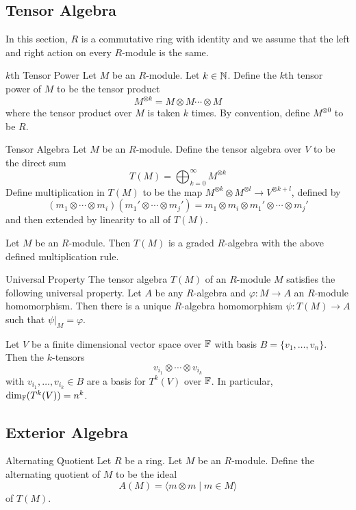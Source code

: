 \documentclass[a4paper]{article}
\begin{document}
\subsection{Tensor Algebra}
In this section, $R$ is a commutative ring with identity and we assume that the left and right action on every $R$-module is the same. 

\begin{defn}{$k$th Tensor Power}{} Let $M$ be an $R$-module. Let $k\in\mathbb{N}$. Define the $k$th tensor power of $M$ to be the tensor product $$M^{\otimes k}=M\otimes M\cdots\otimes M$$ where the tensor product over $M$ is taken $k$ times. By convention, define $M^{\otimes 0}$ to be $R$. 
\end{defn}

\begin{defn}{Tensor Algebra}{} Let $M$ be an $R$-module. Define the tensor algebra over $V$ to be the direct sum $$T(M)=\bigoplus_{k=0}^\infty M^{\otimes k}$$ Define multiplication in $T(M)$ to be the map $M^{\otimes k}\otimes M^{\otimes l}\to V^{\otimes k+l}$, defined by $$(m_1\otimes\cdots\otimes m_i)(m_1'\otimes\cdots\otimes m_j')=m_1\otimes m_i\otimes m_1'\otimes\cdots\otimes m_j'$$ and then extended by linearity to all of $T(M)$. 
\end{defn}

\begin{prp}{}{} Let $M$ be an $R$-module. Then $T(M)$ is a graded $R$-algebra with the above defined multiplication rule. 
\end{prp}

\begin{prp}{Universal Property}{} The tensor algebra $T(M)$ of an $R$-module $M$ satisfies the following universal property. Let $A$ be any $R$-algebra and $\varphi:M\to A$ an $R$-module homomorphism. Then there is a unique $R$-algebra homomorphism $\psi:T(M)\to A$ such that $\psi|_M=\varphi$. 
\end{prp}

\begin{prp}{}{} Let $V$ be a finite dimensional vector space over $\mathbb{F}$ with basis $B=\{v_1,\dots,v_n\}$. Then the $k$-tensors $$v_{i_1}\otimes\cdots\otimes v_{i_k}$$ with $v_{i_1},\dots,v_{i_k}\in B$ are a basis for $T^k(V)$ over $\mathbb{F}$. In particular, $\dim_{\mathbb{F}}(T^k(V))=n^k$. 
\end{prp}

\subsection{Exterior Algebra}
\begin{defn}{Alternating Quotient}{} Let $R$ be a ring. Let $M$ be an $R$-module. Define the alternating quotient of $M$ to be the ideal $$A(M)=\langle m\otimes m\;|\;m\in M\rangle$$ of $T(M)$. 
\end{defn}
\end{document}

